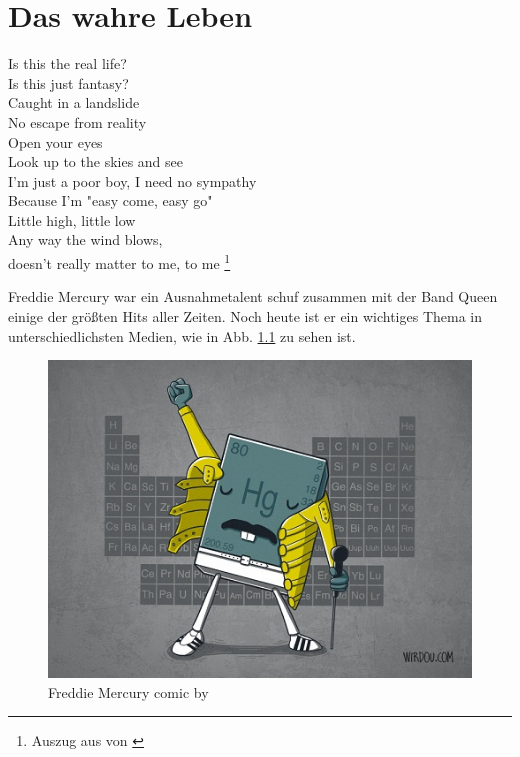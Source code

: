 \chapter{Das wahre Leben}

\begin{center}
Is this the real life? \\
Is this just fantasy? \\
Caught in a landslide \\
No escape from reality \\
Open your eyes \\
Look up to the skies and see \\
I'm just a poor boy, I need no sympathy \\
Because I'm "{}easy come, easy go"{} \\ %
Little high, little low \\
Any way the wind blows, \\
doesn't really matter to me, 
to me \footnote{Auszug aus \citet{BohemRhap} von \citet{Queen}}\\
\end{center}

Freddie Mercury war ein Ausnahmetalent schuf zusammen mit der Band Queen einige der größten Hits aller Zeiten. Noch heute ist er ein wichtiges Thema in unterschiedlichsten Medien, wie in Abb. \ref{fig:freddiehg} zu sehen ist.
\begin{figure}
\begin{center} \includegraphics{figures/freddie_mercury_by_wirdoudesigns.jpg} \end{center}
\caption{Freddie Mercury comic by \citet{wirdou}}
\label{fig:freddiehg}
\end{figure}

\newpage